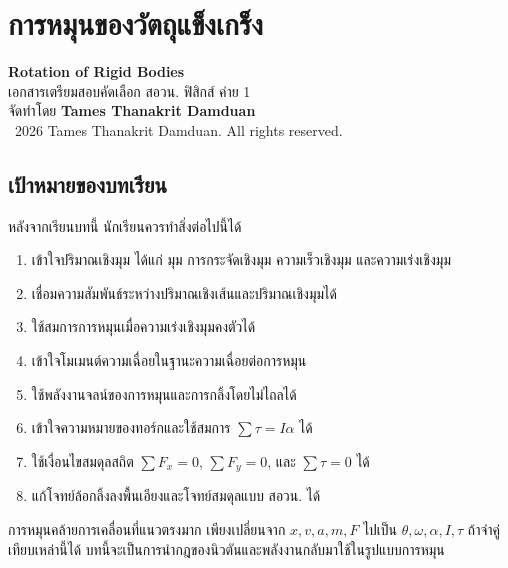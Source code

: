
\chapter{การหมุนของวัตถุแข็งเกร็ง}

\begin{center}
    {\Large \textbf{Rotation of Rigid Bodies}}\\[4pt]
    {\normalsize เอกสารเตรียมสอบคัดเลือก สอวน. ฟิสิกส์ ค่าย 1}\\[6pt]
    {\normalsize จัดทำโดย \textbf{Tames Thanakrit Damduan}}\\[2pt]
    {\footnotesize \textcopyright\ 2026 Tames Thanakrit Damduan. All rights reserved.}\\[8pt]
\end{center}

\section*{เป้าหมายของบทเรียน}

หลังจากเรียนบทนี้ นักเรียนควรทำสิ่งต่อไปนี้ได้

\begin{enumerate}
    \item เข้าใจปริมาณเชิงมุม ได้แก่ มุม การกระจัดเชิงมุม ความเร็วเชิงมุม และความเร่งเชิงมุม
    \item เชื่อมความสัมพันธ์ระหว่างปริมาณเชิงเส้นและปริมาณเชิงมุมได้
    \item ใช้สมการการหมุนเมื่อความเร่งเชิงมุมคงตัวได้
    \item เข้าใจโมเมนต์ความเฉื่อยในฐานะความเฉื่อยต่อการหมุน
    \item ใช้พลังงานจลน์ของการหมุนและการกลิ้งโดยไม่ไถลได้
    \item เข้าใจความหมายของทอร์กและใช้สมการ $\sum \tau = I\alpha$ ได้
    \item ใช้เงื่อนไขสมดุลสถิต $\sum F_x=0$, $\sum F_y=0$, และ $\sum \tau=0$ ได้
    \item แก้โจทย์ล้อกลิ้งลงพื้นเอียงและโจทย์สมดุลแบบ สอวน. ได้
\end{enumerate}

\begin{tcolorbox}[title=แนวคิดสำคัญของบทนี้]
การหมุนคล้ายการเคลื่อนที่แนวตรงมาก เพียงเปลี่ยนจาก $x,v,a,m,F$ ไปเป็น $\theta,\omega,\alpha,I,\tau$ ถ้าจำคู่เทียบเหล่านี้ได้ บทนี้จะเป็นการนำกฎของนิวตันและพลังงานกลับมาใช้ในรูปแบบการหมุน
\end{tcolorbox}

